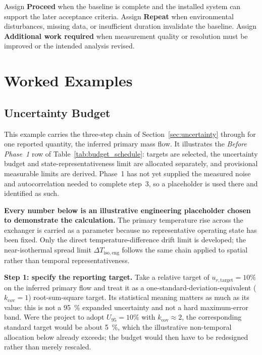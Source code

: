 \documentclass[11pt]{article}
\begin{document}
Assign \textbf{Proceed} when the baseline is complete and the installed system can support the later acceptance criteria. Assign \textbf{Repeat} when environmental disturbances, missing data, or insufficient duration invalidate the baseline. Assign \textbf{Additional work required} when measurement quality or resolution must be improved or the intended analysis revised.


\clearpage
\section{Worked Examples}
\subsection{Uncertainty Budget}
\label{sec:budget_example}

This example carries the three-step chain of Section~\ref{sec:uncertainty} through for one reported quantity, the inferred primary mass flow. It illustrates the \emph{Before Phase~1} row of Table~\ref{tab:budget_schedule}: targets are selected, the uncertainty budget and state-representativeness limit are allocated separately, and provisional measurable limits are derived. Phase~1 has not yet supplied the measured noise and autocorrelation needed to complete step~3, so a placeholder is used there and identified as such.

\textbf{Every number below is an illustrative engineering placeholder chosen to demonstrate the calculation.} The primary temperature rise across the exchanger is carried as a parameter because no representative operating state has been fixed. Only the direct temperature-difference drift limit is developed; the near-isothermal spread limit $\Delta T_{\mathrm{iso,eng}}$ follows the same chain applied to spatial rather than temporal representativeness.

\textbf{Step 1: specify the reporting target.} Take a relative target of $u_{r,\mathrm{target}}=10\%$ on the inferred primary flow and treat it as a one-standard-deviation-equivalent ($k_{\mathrm{cov}}=1$) root-sum-square target. Its statistical meaning matters as much as its value: this is not a \SI{95}{\percent} expanded uncertainty and not a hard maximum-error band. Were the project to adopt $U_{95}=10\%$ with $k_{\mathrm{cov}}\approx2$, the corresponding standard target would be about \SI{5}{\percent}, which the illustrative non-temporal allocation below already exceeds; the budget would then have to be redesigned rather than merely rescaled.
\end{document}

